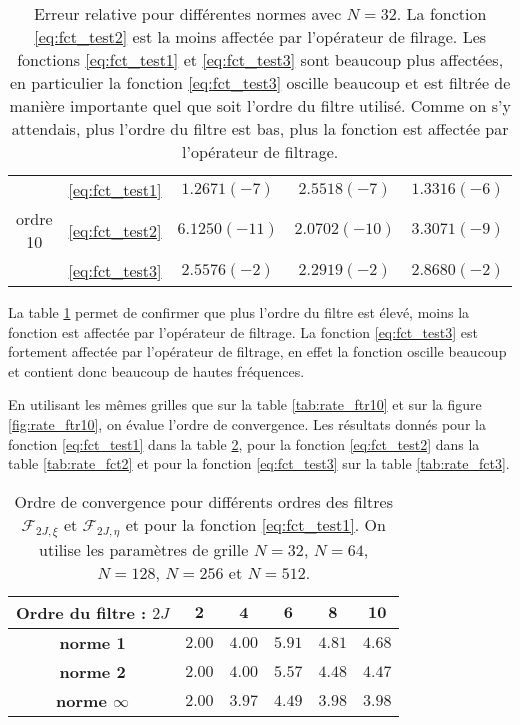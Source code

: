 \begin{table}[htbp]
\begin{center}
\begin{tabular}{|c||c||c|c|c|}
     & \eqref{eq:fct_test1} 
     & $1.2671(-7)$  & $2.5518(-7)$  & $1.3316(-6)$  \\
ordre 10	& \eqref{eq:fct_test2} & $6.1250(-11)$  & $2.0702(-10)$  & $3.3071(-9)$  \\
     & \eqref{eq:fct_test3} & $2.5576(-2)$  & $2.2919(-2)$  & $2.8680(-2)$  \\
\hline

\end{tabular}
\end{center}
\caption{Erreur relative pour différentes normes avec $N=32$. La fonction \eqref{eq:fct_test2} est la moins affectée par l'opérateur de filrage. Les fonctions \eqref{eq:fct_test1} et \eqref{eq:fct_test3} sont beaucoup plus affectées, en particulier la fonction \eqref{eq:fct_test3} oscille beaucoup et est filtrée de manière importante quel que soit l'ordre du filtre utilisé. Comme on s'y attendais, plus l'ordre du filtre est bas, plus la fonction est affectée par l'opérateur de filtrage.}
\label{tab:diff_ftr}
\end{table} 

La table \ref{tab:diff_ftr} permet de confirmer que plus l'ordre du filtre est élevé, moins la fonction est affectée par l'opérateur de filtrage. La fonction \eqref{eq:fct_test3} est fortement affectée par l'opérateur de filtrage, en effet la fonction oscille beaucoup et contient donc beaucoup de hautes fréquences.

En utilisant les mêmes grilles que sur la table \ref{tab:rate_ftr10} et sur la figure \ref{fig:rate_ftr10}, on évalue l'ordre de convergence. Les résultats donnés pour la fonction \eqref{eq:fct_test1} dans la table \ref{tab:rate_fct1}, pour la fonction \eqref{eq:fct_test2} dans la table \ref{tab:rate_fct2} et pour la fonction \eqref{eq:fct_test3} sur la table \ref{tab:rate_fct3}.

\begin{table}[htbp]
\begin{center}
\begin{tabular}{|c||c|c|c|c|c|}
\hline
\textbf{Ordre du filtre :} $2J$ & $\mathbf{2}$ & $\mathbf{4}$ & $\mathbf{6}$ & $\mathbf{8}$ & $\mathbf{10}$ \\
\hline
\hline
\textbf{norme 1} & $2.00$ & $4.00$ & $5.91$ & $4.81$ & $4.68$\\
\textbf{norme 2} & $2.00$ & $4.00$ & $5.57$ & $4.48$ & $4.47$\\
\textbf{norme $\infty$} & $2.00$ & $3.97$ & $4.49$ & $3.98$ & $3.98$\\
\hline
\end{tabular}
\end{center}
\caption{Ordre de convergence pour différents ordres des filtres $\mathcal{F}_{2J,\xi}$ et $\mathcal{F}_{2J,\eta}$ et pour la fonction \eqref{eq:fct_test1}. On utilise les paramètres de grille $N=32$, $N=64$, $N=128$, $N=256$ et $N=512$.}
\label{tab:rate_fct1}
\end{table} 

